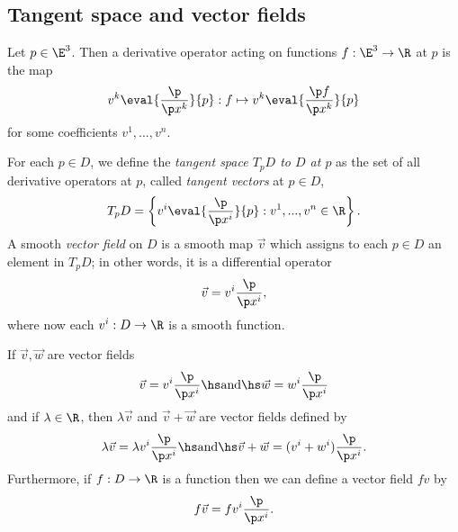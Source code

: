 \documentclass{article}
\begin{document}
\subsection{Tangent space and vector fields}

\begin{definition}
    Let $p\in\E^3$. Then a derivative operator acting on functions $f:\E^3\to\R$
    at $p$ is the map
    \begin{align*}
        v^k \eval{\frac{\p }{\p x^k}}{p} : 
        f \mapsto v^k \eval{\frac{\p f}{\p x^k}}{p}    
    \end{align*}
    for some coefficients $v^1,...,v^n$.
\end{definition}

\begin{definition}
    For each $p\in D$, we define the \emph{tangent space $T_pD$ to $D$ at $p$} as the
    set of all derivative operators at $p$, called \emph{tangent vectors} at $p\in D$,
    \begin{align*}
        T_p D =\left\lbrace v^i \eval{\frac{\p}{\p x^i}}{p}: v^1,...,v^n\in\R\right\rbrace.
    \end{align*}
    A smooth \emph{vector field} on $D$ is a smooth map $\vec v$ which assigns to each 
    $p\in D$ an element in $T_pD$; in other words,
    it is a differential operator
    \begin{align*}
        \vec v = v^i\frac{\p}{\p x^i},
    \end{align*}
    where now each $v^i:D\to\R$ is a smooth function.
\end{definition}

\begin{definition}
    If $\vec v,\vec w$ are vector fields
    \begin{align*}
        \vec v = v^i \frac{\p}{\p x^i}\hs\text{and}\hs \vec w = w^i \frac{\p }{\p x^i}
    \end{align*}
    and if $\lambda\in\R$, then $\lambda \vec v$ and $\vec v+\vec w$ are vector fields defined by
    \begin{align*}
        \lambda \vec v = \lambda v^i \frac{\p }{\p x^i}\hs\text{and}\hs
        \vec v+\vec w = (v^i+w^i)\frac{\p }{\p x^i}.
    \end{align*}
    Furthermore, if $f:D\to\R$ is a function then we can define a vector field
    $fv$ by
    \begin{align*}
        f\vec v = fv^i\frac{\p }{\p x^i}.
    \end{align*}
\end{definition}
\end{document}
